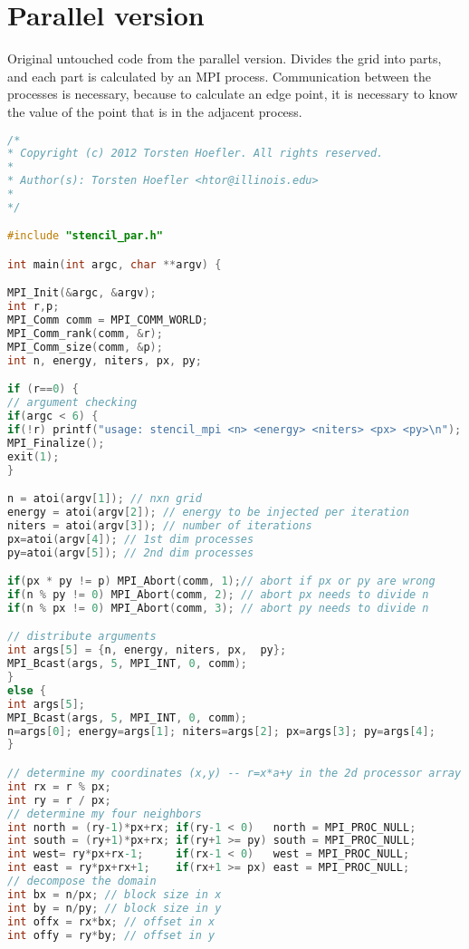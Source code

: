 \section{Parallel version}
\label{bljCpar}

Original untouched code from the parallel version. Divides the grid into parts, and each part is calculated by an MPI process. Communication between the processes is necessary, because to calculate an edge point, it is necessary to know the value of the point that is in the adjacent process.

\begin{lstlisting}[language=C, label={lst_stencpara}, caption={stencil\_mpi.c.}]
/*
* Copyright (c) 2012 Torsten Hoefler. All rights reserved.
*
* Author(s): Torsten Hoefler <htor@illinois.edu>
*
*/

#include "stencil_par.h"

int main(int argc, char **argv) {

MPI_Init(&argc, &argv);
int r,p;
MPI_Comm comm = MPI_COMM_WORLD;
MPI_Comm_rank(comm, &r);
MPI_Comm_size(comm, &p);
int n, energy, niters, px, py;

if (r==0) {
// argument checking
if(argc < 6) {
if(!r) printf("usage: stencil_mpi <n> <energy> <niters> <px> <py>\n");
MPI_Finalize();
exit(1);
}

n = atoi(argv[1]); // nxn grid
energy = atoi(argv[2]); // energy to be injected per iteration
niters = atoi(argv[3]); // number of iterations
px=atoi(argv[4]); // 1st dim processes
py=atoi(argv[5]); // 2nd dim processes

if(px * py != p) MPI_Abort(comm, 1);// abort if px or py are wrong
if(n % py != 0) MPI_Abort(comm, 2); // abort px needs to divide n
if(n % px != 0) MPI_Abort(comm, 3); // abort py needs to divide n

// distribute arguments
int args[5] = {n, energy, niters, px,  py};
MPI_Bcast(args, 5, MPI_INT, 0, comm);
}
else {
int args[5];
MPI_Bcast(args, 5, MPI_INT, 0, comm);
n=args[0]; energy=args[1]; niters=args[2]; px=args[3]; py=args[4];
}

// determine my coordinates (x,y) -- r=x*a+y in the 2d processor array
int rx = r % px;
int ry = r / px;
// determine my four neighbors
int north = (ry-1)*px+rx; if(ry-1 < 0)   north = MPI_PROC_NULL;
int south = (ry+1)*px+rx; if(ry+1 >= py) south = MPI_PROC_NULL;
int west= ry*px+rx-1;     if(rx-1 < 0)   west = MPI_PROC_NULL;
int east = ry*px+rx+1;    if(rx+1 >= px) east = MPI_PROC_NULL;
// decompose the domain
int bx = n/px; // block size in x
int by = n/py; // block size in y
int offx = rx*bx; // offset in x
int offy = ry*by; // offset in y


\end{lstlisting}
